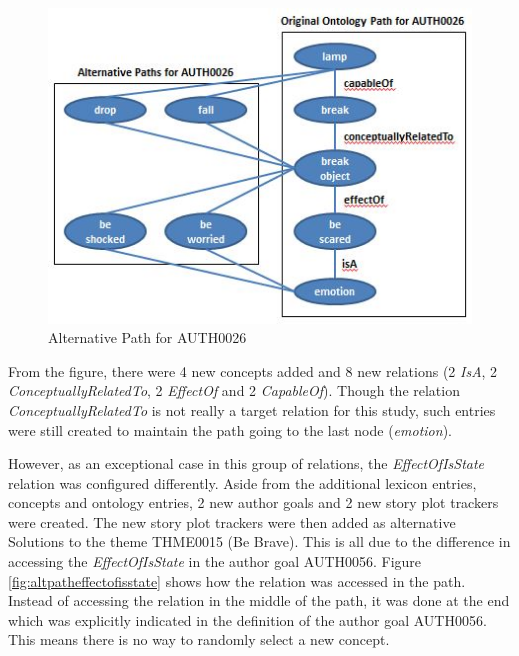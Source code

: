 \begin{figure}[h]                %
   \centering                    %
   \includegraphics{altpath.jpg}      %
   \caption{Alternative Path for AUTH0026}
    \label{fig:altpath}
\end{figure}

From the figure, there were 4 new concepts added and 8 new relations (2 \textit{IsA}, 2 \textit{ConceptuallyRelatedTo}, 2 \textit{EffectOf} and 2  \textit{CapableOf}). Though the relation \textit{ConceptuallyRelatedTo} is not really a target relation for this study, such entries were still created to maintain the path going to the last node (\textit{emotion}). 

However, as an exceptional case in this group of relations, the \textit{EffectOfIsState} relation was configured differently. Aside from the additional lexicon entries, concepts and ontology entries, 2 new author goals and 2 new story plot trackers were created. The new story plot trackers were then added as alternative Solutions to the theme THME0015 (Be Brave). This is all due to the difference in accessing the \textit{EffectOfIsState} in the author goal AUTH0056. Figure \ref{fig:altpatheffectofisstate} shows how the relation was accessed in the path. Instead of accessing the relation in the middle of the path, it was done at the end which was explicitly indicated in the definition of the author goal AUTH0056. This means there is no way to randomly select a new concept. 

